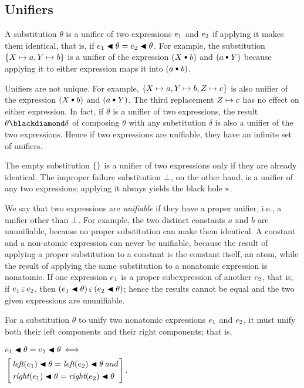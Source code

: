 \documentclass[runningheads]{llncs}
\DeclareMathOperator{\uand}{\emph{and}\,}
\DeclareMathOperator{\uiff}{\iff}
\DeclareMathOperator{\lef}{\emph{left}}
\DeclareMathOperator{\rig}{\emph{right}}
\begin{document}
  \subsection{Unifiers}  A substitution $\theta$ is a unifier of two expressions $e_{1}$ and $e_{2}$ if applying it makes them identical, that is, if $e_{1} \blacktriangleleft \theta = e_{2} \blacktriangleleft \theta$. For example, the substitution  $\{X \mapsto a, Y \mapsto b\}$ is a  unifier of the expression $(\var{X} \cons b)$ and $(a \cons \var{Y})$ because applying it to either expression maps it into $(a \cons b)$.
 
 Unifiers are not unique. For example,  $\{X \mapsto a, Y \mapsto b, Z \mapsto c\}$ is also  unifier of the expression $(\var{X} \cons b)$ and $(a \cons \var{Y})$.   The third replacement $Z \mapsto c$ has no effect on either expression.  In fact, if $\theta$ is a unifier of two expressions, the result $\theta \compose \delta$ of composing $\theta$ with any substitution $\delta$ is also a unifier of the two expressions. Hence if two expressions are unifiable, they have an infinite set of unifiers. 
 
 The empty substitution $\{\}$ is a unifier of two expressions only if they are already identical.  The improper failure substitution $\bot$, on the other hand,  is a unifier of any two expressions; applying it always yields the black hole $\ast$.
 
 We say that two expressions are \emph{unifiable} if they have a proper unifier, i.e., a unifier other than $\bot$. For example, the two distinct constants $a$ and $b$ are ununifiable, because no proper substitution can make them identical. A constant and a non-atomic expression can never be unifiable, because the result of applying a proper substitution to a constant is the constant itself, an atom, while the result of applying the same substitution to a nonatomic expression is nonatomic. If one expression $e_{1}$ is a proper subexpression of another $e_{2}$, that is, if $e_{1} \, \varepsilon \, e_{2}$, then
 $(e_{1}\blacktriangleleft \theta) \, \varepsilon \, (e_{2}\blacktriangleleft \theta)$; hence the results cannot be equal and the two given expressions are ununifiable.

 For a substitution $\theta$ to unify two nonatomic expressions $e_{1}$ and $e_{2}$, it must unify both their left components and their right components;  that is,

    {$\begin{aligned}
  &\e{1} \apply \theta = \e{2} \apply \theta
  \uiff \\
  &\left[{\begin{aligned}
  &\lef(\e{1}) \apply \theta = \lef(\e{2}) \apply \theta \uand \\
  & \rig(\e{1}) \apply \theta = \rig(\e{2}) \apply \theta
  \end{aligned}} \right].\\[10pt]
\end{aligned}$}
 
\end{document}
